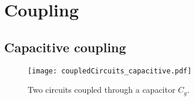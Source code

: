 



\section{Coupling}

\subsection{Capacitive coupling}

\begin{figure}
\begin{centering}
\texttt{[image: coupledCircuits\_capacitive.pdf]}
\par\end{centering}
\caption{Two circuits coupled through a capacitor $C_g$.}
\label{Fig:coupledCircuits_capacitive}
\end{figure}

